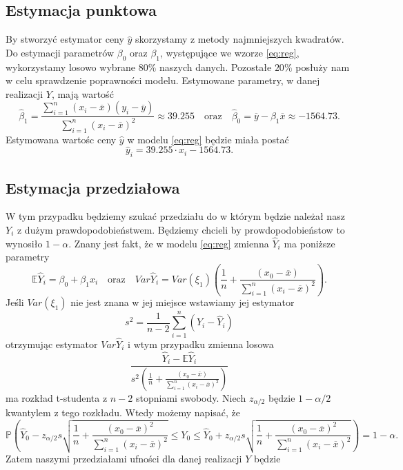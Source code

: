 \documentclass[12pt,leqno]{article}
\theoremstyle{exer}
\begin{document}
	\subsection{Estymacja punktowa}
	By stworzyć estymator ceny $\hat y$ skorzystamy z metody najmniejszych kwadratów. Do estymacji parametrów $\beta_0$ oraz $\beta_1$, występujące we wzorze \eqref{eq:reg}, wykorzystamy losowo wybrane $80\%$ naszych danych. Pozostałe $20\%$ posłuży nam w celu sprawdzenie poprawności modelu. Estymowane parametry, w danej realizacji $Y$, mają wartość
	\begin{equation}
		\hat\beta_1=\frac{\sum_{i=1}^n\left(x_i-\overline{x}\right)\left(y_i-\overline{y}\right)}
		{\sum_{i=1}^n\left(x_i-\overline{x}\right)^2}\approx39.255 \quad \text{oraz} \quad
		\hat\beta_0=\overline{y}-\beta_1\overline{x}\approx-1564.73.
	\end{equation}
	Estymowana wartośc ceny $\hat y$ w modelu \eqref{eq:reg} będzie miała postać
	\begin{equation}
		\hat y_i = 39.255\cdot x_i -1564.73.
	\end{equation}
	\subsection{Estymacja przedziałowa}
	W tym przypadku będziemy szukać przedziału do w którym będzie należał nasz $Y_i$ z dużym prawdopodobieństwem. Będziemy chcieli by prowdopodobieństow to wynosiło $1-\alpha$. Znany jest fakt, że w modelu \eqref{eq:reg} zmienna $\hat{Y}_i$ ma poniższe parametry
	\begin{equation}
		\mathbb{E}\hat Y_i = \beta_0+\beta_1x_i \quad\text{oraz}\quad Var \hat Y_i=Var\left(\xi_1\right)\left(\frac{1}{n}+\frac{(x_0-\overline{x})}{\sum_{i=1}^{n}\left(x_i-\overline{x}\right)^2}\right).
	\end{equation} 
	Jeśli $Var\left(\xi_1\right)$ nie jest znana w jej miejsce wstawiamy jej estymator
	\begin{equation}
		s^2=\frac{1}{n-2}\sum_{i=1}^{n}\left(Y_i-\hat Y_i\right)
	\end{equation}
	otrzymując estymator $Var \hat Y_i$ i wtym przypadku zmienna losowa
	\begin{equation}
		\frac{\hat Y_i-\mathbb{E}\hat Y_i}{s^2\left(\frac{1}{n}+\frac{(x_0-\overline{x})}{\sum_{i=1}^{n}\left(x_i-\overline{x}\right)^2}\right)}
	\end{equation}
	ma rozkład t-studenta z $n-2$ stopniami swobody. Niech $z_{\alpha/2}$ będzie $1-\alpha/2$ kwantylem z tego rozkładu. Wtedy możemy napisać, że 
	\begin{equation}
		\mathbb{P}\left(\hat Y_0 - z_{\alpha/2}s\sqrt{\frac{1}{n}+\frac{\left(x_0-\overline{x}\right)^2}{\sum_{i=1}^n\left(x_i-\overline{x}\right)^2}}\leq Y_0\leq\hat Y_0 + z_{\alpha/2}s\sqrt{\frac{1}{n}+\frac{\left(x_0-\overline{x}\right)^2}{\sum_{i=1}^n\left(x_i-\overline{x}\right)^2}}\right)=1-\alpha.
	\end{equation}
	Zatem naszymi przedziałami ufności dla danej realizacji $Y$ będzie 
\end{document}
